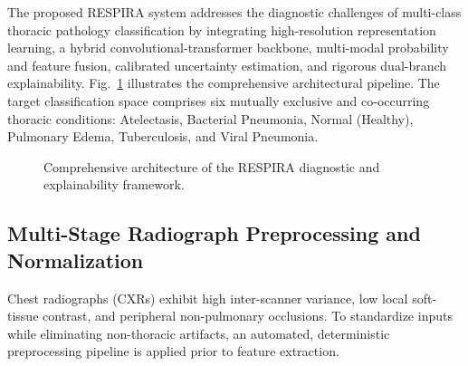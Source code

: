 \documentclass[journal]{IEEEtran}
\begin{document}
The proposed RESPIRA system addresses the diagnostic challenges of multi-class thoracic pathology classification by integrating high-resolution representation learning, a hybrid convolutional-transformer backbone, multi-modal probability and feature fusion, calibrated uncertainty estimation, and rigorous dual-branch explainability. Fig.~\ref{fig:overall_architecture} illustrates the comprehensive architectural pipeline. The target classification space comprises six mutually exclusive and co-occurring thoracic conditions: Atelectasis, Bacterial Pneumonia, Normal (Healthy), Pulmonary Edema, Tuberculosis, and Viral Pneumonia.

\begin{figure}[!t]
\centering
{}
\caption{Comprehensive architecture of the RESPIRA diagnostic and explainability framework.}
\label{fig:overall_architecture}
\end{figure}

\subsection{Multi-Stage Radiograph Preprocessing and Normalization}
\label{subsec:preprocessing}

Chest radiographs (CXRs) exhibit high inter-scanner variance, low local soft-tissue contrast, and peripheral non-pulmonary occlusions. To standardize inputs while eliminating non-thoracic artifacts, an automated, deterministic preprocessing pipeline is applied prior to feature extraction.
\end{document}
